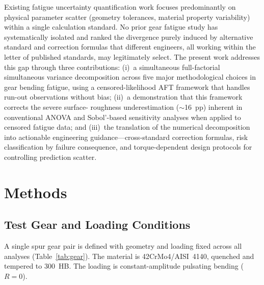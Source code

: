 \documentclass[12pt,a4paper]{article}
\begin{document}
Existing fatigue uncertainty quantification work focuses predominantly
on physical parameter scatter (geometry tolerances, material property
variability) within a single calculation standard. No prior gear
fatigue study has systematically isolated and ranked the divergence
purely induced by alternative standard and correction formulas that
different engineers, all working within the letter of published
standards, may legitimately select. The present work addresses this
gap through three contributions: (i)~a simultaneous
full-factorial
simultaneous variance decomposition across five major methodological
choices in gear bending fatigue, using a censored-likelihood AFT
framework that handles run-out observations without bias;
(ii)~a demonstration that this framework corrects the severe surface-
roughness underestimation ($\sim$16~pp) inherent in conventional
ANOVA and Sobol'-based sensitivity analyses when applied to censored
fatigue data; and (iii)~the translation of the numerical
decomposition into actionable engineering guidance---cross-standard
correction formulas, risk classification by failure consequence,
and torque-dependent design protocols for controlling prediction
scatter.

\section{Methods}
\label{sec:methods}

\subsection{Test Gear and Loading Conditions}

A single spur gear pair is defined with geometry and loading fixed
across all analyses (Table~\ref{tab:gear}). The material is
42CrMo4/AISI~4140, quenched and tempered to 300~HB. The loading is
constant-amplitude pulsating bending ($R=0$).
\end{document}
